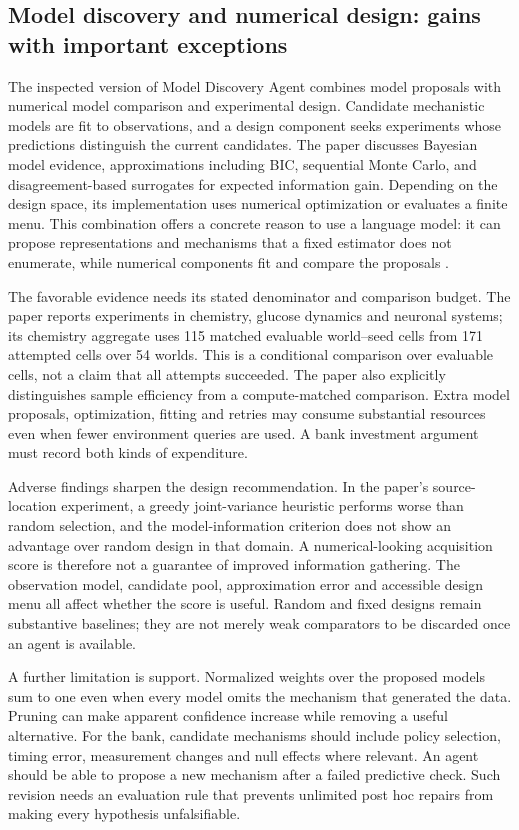 \subsection{Model discovery and numerical design: gains with important exceptions}

The inspected version of Model Discovery Agent combines model proposals with
numerical model comparison and experimental design. Candidate mechanistic
models are fit to observations, and a design component seeks experiments whose
predictions distinguish the current candidates. The paper discusses Bayesian
model evidence, approximations including BIC, sequential Monte Carlo, and
disagreement-based surrogates for expected information gain. Depending on the
design space, its implementation uses numerical optimization or evaluates a
finite menu. This combination offers a concrete reason to use a language
model: it can propose representations and mechanisms that a fixed estimator
does not enumerate, while numerical components fit and compare the proposals
\citep{v12_la_2608_09696}.

The favorable evidence needs its stated denominator and comparison budget.
The paper reports experiments in chemistry, glucose dynamics and neuronal
systems; its chemistry aggregate uses 115 matched evaluable world--seed cells
from 171 attempted cells over 54 worlds. This is a conditional comparison over
evaluable cells, not a claim that all attempts succeeded. The paper also
explicitly distinguishes sample efficiency from a compute-matched comparison.
Extra model proposals, optimization, fitting and retries may consume substantial
resources even when fewer environment queries are used. A bank investment
argument must record both kinds of expenditure.

Adverse findings sharpen the design recommendation. In the paper's
source-location experiment, a greedy joint-variance heuristic performs worse
than random selection, and the model-information criterion does not show an
advantage over random design in that domain. A numerical-looking acquisition
score is therefore not a guarantee of improved information gathering.
The observation model, candidate pool, approximation error and accessible
design menu all affect whether the score is useful. Random and fixed designs
remain substantive baselines; they are not merely weak comparators to be
discarded once an agent is available.

A further limitation is support. Normalized weights over the proposed models
sum to one even when every model omits the mechanism that generated the data.
Pruning can make apparent confidence increase while removing a useful
alternative. For the bank, candidate mechanisms should include policy
selection, timing error, measurement changes and null effects where relevant.
An agent should be able to propose a new mechanism after a failed predictive
check. Such revision needs an evaluation rule that prevents unlimited
post hoc repairs from making every hypothesis unfalsifiable.

